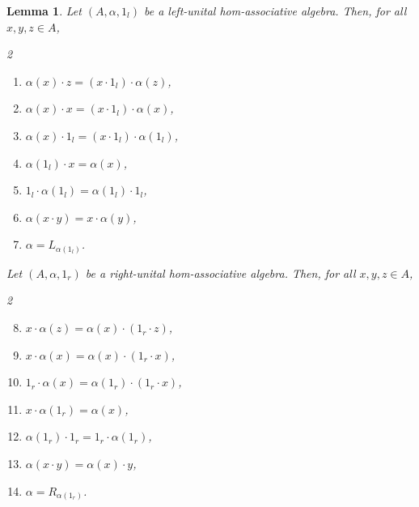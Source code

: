 \documentclass[12pt]{article}
\newtheorem{lemma}[theorem]{Lemma}
\begin{document}
		\begin{lemma}\label{lem:unit-fundamental}
			Let $(A,\alpha,1_l)$ be a left-unital hom-associative algebra. Then, for all $x,y,z\in A$,
			\begin{multicols}{2}\raggedcolumns
				\begin{enumerate}[label=\textnormal{(\roman*)},ref=\textnormal{(\roman*)}]
					\item $\alpha(x)\cdot z=(x\cdot  1_l)\cdot \alpha(z)$,
					\item $\alpha(x)\cdot  x=(x\cdot  1_l)\cdot \alpha(x)$,
					\item $\alpha(x)\cdot 1_l=(x\cdot  1_l)\cdot \alpha(1_l)$,
					\item $\alpha(1_l)\cdot  x=\alpha(x)$,
					\item $1_l\cdot \alpha(1_l)=\alpha(1_l)\cdot  1_l$,
					\item $\alpha(x\cdot  y)=x\cdot \alpha(y)$,
					\item $\alpha=L_{\alpha(1_l)}$.
				\end{enumerate}
			\end{multicols}
			Let $(A,\alpha,1_r)$ be a right-unital hom-associative algebra. Then, for all $x,y,z\in A$,
			\begin{multicols}{2}\raggedcolumns
				\begin{enumerate}[label=\textnormal{(\roman*)},ref=\textnormal{(\roman*)}]
					\setcounter{enumi}{7}
					\item $x\cdot \alpha(z)=\alpha(x)\cdot (1_r\cdot  z)$,
					\item $x\cdot \alpha(x)=\alpha(x)\cdot (1_r\cdot  x)$,
					\item $1_r\cdot \alpha(x)=\alpha(1_r)\cdot (1_r\cdot  x)$,
					\item $x\cdot \alpha(1_r)=\alpha(x)$,
					\item $\alpha(1_r)\cdot  1_r=1_r\cdot \alpha(1_r)$,
					\item $\alpha(x\cdot  y)=\alpha(x)\cdot  y$,
					\item $\alpha=R_{\alpha(1_r)}$.
				\end{enumerate}
			\end{multicols}
		\end{lemma}
\end{document}
